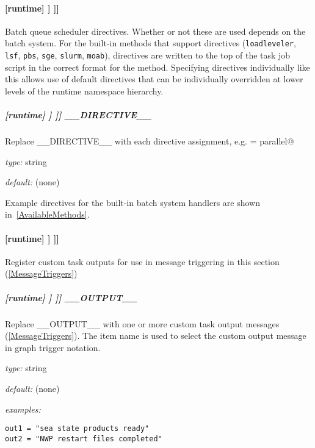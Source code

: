 \paragraph[{[[[}directives{]]]}]{[runtime] \textrightarrow [[\_\_NAME\_\_]] \textrightarrow [[[directives]]]}

Batch queue scheduler directives.  Whether or not these are used depends
on the batch system. For the built-in methods that support directives
(\lstinline=loadleveler=, \lstinline=lsf=, \lstinline=pbs=, \lstinline=sge=,
\lstinline=slurm=, \lstinline=moab=), directives are written to the top of the
task job script in the correct format for the method. Specifying directives
individually like this allows use of default directives that can be
individually overridden at lower levels of the runtime namespace hierarchy.

\subparagraph[\_\_DIRECTIVE\_\_ ]{[runtime] \textrightarrow [[\_\_NAME\_\_]] \textrightarrow [[[directives]]] \textrightarrow \_\_DIRECTIVE\_\_}

Replace \_\_DIRECTIVE\_\_ with each directive assignment, e.g.
\lstinline@class = parallel@

\begin{myitemize}
\item {\em type:} string
\item {\em default:} (none)
\end{myitemize}

Example directives for the built-in batch system handlers are shown
in~\ref{AvailableMethods}.

\paragraph[{[[[}outputs{]]]}]{[runtime] \textrightarrow [[\_\_NAME\_\_]] \textrightarrow [[[outputs]]]}

Register custom task outputs for use in message triggering in this section
(\ref{MessageTriggers})

\subparagraph[\_\_OUTPUT\_\_ ]{[runtime] \textrightarrow [[\_\_NAME\_\_]] \textrightarrow [[[outputs]]] \textrightarrow \_\_OUTPUT\_\_}

Replace \_\_OUTPUT\_\_ with one or more custom task output messages
(\ref{MessageTriggers}).  The item name is used to select the custom output
message in graph trigger notation.
\begin{myitemize}
    \item {\em type:} string
    \item {\em default:} (none)
    \item{ \em examples:}
\end{myitemize}
\begin{lstlisting}
out1 = "sea state products ready"
out2 = "NWP restart files completed"
\end{lstlisting}

